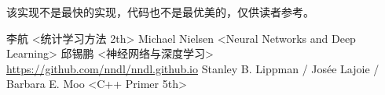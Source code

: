 \documentclass[titlepage,UTF8,zihao=-4]{ctexart}
\begin{document}
该实现不是最快的实现，代码也不是最优美的，仅供读者参考。

\begin{thebibliography}{99}
     李航 <统计学习方法 2th> 
     Michael Nielsen <Neural Networks and Deep Learning> 
     邱锡鹏 <神经网络与深度学习>  \url{https://github.com/nndl/nndl.github.io}
     Stanley B. Lippman / Josée Lajoie / Barbara E. Moo <C++ Primer 5th> 
    
\end{thebibliography}
\end{document}
